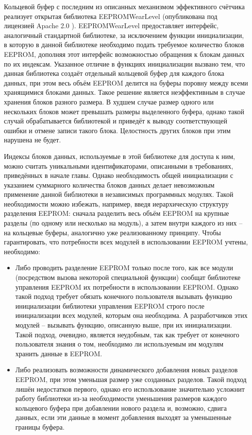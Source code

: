Кольцевой буфер с последним из описанных механизмом эффективного счётчика реализует открытая библиотека EEPROMWearLevel \cite{web:eeprom-wear-level} (опубликована под лицензией Apache 2.0 \cite{web:apache-license-2.0}).
EEPROMWearLevel предоставляет интерфейс, аналогичный стандартной библиотеке, за исключением функции инициализации, в которую в данной библиотеке необходимо подать требуемое количество блоков EEPROM, дополняя этот интерфейс возможностью обращения к блокам данных по их индексам.
Указанное отличие в функциях инициализации вызвано тем, что данная библиотека создаёт отдельный кольцевой буфер для каждого блока данных, при этом весь объём EEPROM делится на буферы поровну между всеми хранящимися блоками данных.
Такое решение является неэффективным в случае хранения блоков разного размера.
В худшем случае размер одного или нескольких блоков может превышать размеры выделенного буфера, однако такой случай обрабатывается библиотекой и приведёт к выводу соответствующей ошибки и отмене записи такого блока.
Целостность других блоков при этим нарушена не будет.

Индексы блоков данных, используемые в этой библиотеке для доступа к ним, можно считать уникальными идентификаторами, описанными в требованиях, приведённых в начале главы.
Однако необходимость общей инициализации с указанием суммарного количества блоков данных делает невозможным применение данной библиотеки в независимых программных модулях.
Такой необходимости можно избежать, например, введя иерархическую структуру разделения EEPROM: сначала разделить весь объём EEPROM на крупные разделы (по одному или несколько на модуль), а затем внутри каждого из них -- на кольцевые буферы, аналогично уже реализованному принципу.
Чтобы гарантировать, что потребности всех модулей в использовании EEPROM учтены, необходимо:
\begin{itemize}
	\item Либо проводить разделение EEPROM только после того, как все модули (посредством вызова некоторой специальной функции) сообщат библиотеке управления EEPROM их потребности в использовании EEPROM. Однако такой подход требует обязать конечного пользователя вызывать функцию инициализации библиотеки управления EEPROM строго после инициализации всех модулей, которым она необходима. А разработчиков этих модулей -- вызывать функцию, описанную выше, при их инициализации. Такой подход, очевидно, является неудобным, так как требует от конечного пользователя знания о том, необходимо ли используемым им модулям хранить данные в EEPROM.
	\item Либо реализовать возможности динамического добавления новых разделов EEPROM, при этом уменьшая размер уже созданных разделов. Такой подход лишён недостатков первого, однако его использование значительно усложнит работу библиотеки из-за необходимости уменьшения размеров каждого кольцевого буфера при добавлении нового раздела и, возможно, сдвига данных, если эти данные в момент добавления выходят за уменьшенные границы буфера.
\end{itemize}

